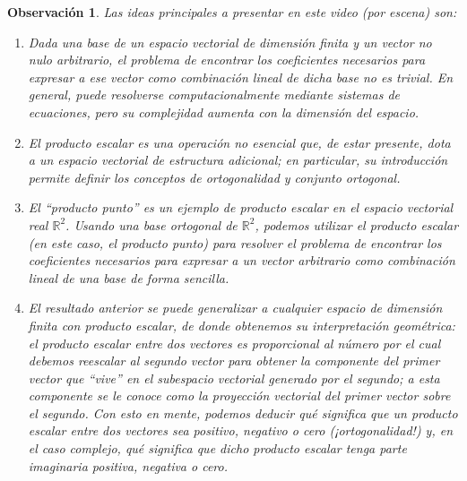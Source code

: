 \documentclass[12pt,dvipsnames]{article}
\newtheorem{obs}{Observación}[section]
\numberwithin{equation}{section}
\begin{document}
\begin{obs}
    Las ideas principales a presentar en este video (por escena) son:
\begin{enumerate}[label=(\roman*)]
    \item Dada una base de un espacio vectorial de dimensión finita y un vector no nulo arbitrario, el problema de encontrar los coeficientes necesarios para expresar a ese vector como combinación lineal de dicha base no es trivial. En general, puede resolverse computacionalmente mediante sistemas de ecuaciones, pero su complejidad aumenta con la dimensión del espacio.
    
    \item El producto escalar es una operación no esencial que, de estar presente, dota a un espacio vectorial de estructura adicional; en particular, su introducción permite definir los conceptos de ortogonalidad y conjunto ortogonal. 
    
    \item El ``producto punto'' es un ejemplo de producto escalar en el espacio vectorial real $\mathbb{R}^2$. Usando una base ortogonal de $\mathbb{R}^2$, podemos utilizar el producto escalar (en este caso, el producto punto) para resolver el problema de encontrar los coeficientes necesarios para expresar a un vector arbitrario como combinación lineal de una base de forma sencilla. %

    \item El resultado anterior se puede generalizar a cualquier espacio de dimensión finita con producto escalar, de donde obtenemos su interpretación geométrica: el producto escalar entre dos vectores es proporcional al número por el cual debemos reescalar al segundo vector para obtener la componente del primer vector que ``vive'' en el subespacio vectorial generado por el segundo; a esta componente se le conoce como la \emph{proyección vectorial} del primer vector sobre el segundo. Con esto en mente, podemos deducir qué significa que un producto escalar entre dos vectores sea positivo, negativo o cero (¡ortogonalidad!) y, en el caso complejo, qué significa que dicho producto escalar tenga parte imaginaria positiva, negativa o cero.
\end{enumerate}
\end{obs}
\end{document}
